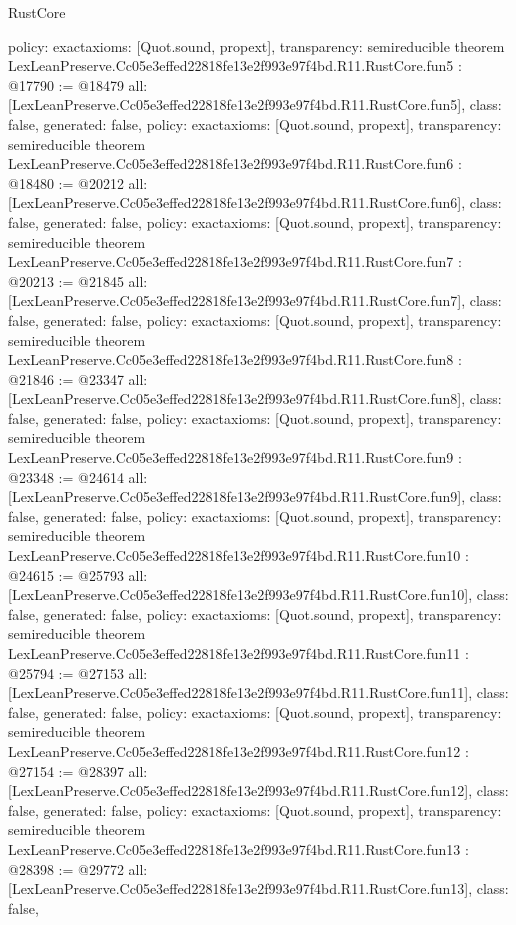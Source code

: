 \begin{lexlean}{RustCore}
\begin{coremodule}
{  policy: exact{axioms: [Quot.sound, propext]},
  transparency: semireducible
}
theorem LexLeanPreserve.Cc05e3effed22818fe13e2f993e97f4bd.R11.RustCore.fun5 : @17790 := @18479 {
  all: [LexLeanPreserve.Cc05e3effed22818fe13e2f993e97f4bd.R11.RustCore.fun5],
  class: false,
  generated: false,
  policy: exact{axioms: [Quot.sound, propext]},
  transparency: semireducible
}
theorem LexLeanPreserve.Cc05e3effed22818fe13e2f993e97f4bd.R11.RustCore.fun6 : @18480 := @20212 {
  all: [LexLeanPreserve.Cc05e3effed22818fe13e2f993e97f4bd.R11.RustCore.fun6],
  class: false,
  generated: false,
  policy: exact{axioms: [Quot.sound, propext]},
  transparency: semireducible
}
theorem LexLeanPreserve.Cc05e3effed22818fe13e2f993e97f4bd.R11.RustCore.fun7 : @20213 := @21845 {
  all: [LexLeanPreserve.Cc05e3effed22818fe13e2f993e97f4bd.R11.RustCore.fun7],
  class: false,
  generated: false,
  policy: exact{axioms: [Quot.sound, propext]},
  transparency: semireducible
}
theorem LexLeanPreserve.Cc05e3effed22818fe13e2f993e97f4bd.R11.RustCore.fun8 : @21846 := @23347 {
  all: [LexLeanPreserve.Cc05e3effed22818fe13e2f993e97f4bd.R11.RustCore.fun8],
  class: false,
  generated: false,
  policy: exact{axioms: [Quot.sound, propext]},
  transparency: semireducible
}
theorem LexLeanPreserve.Cc05e3effed22818fe13e2f993e97f4bd.R11.RustCore.fun9 : @23348 := @24614 {
  all: [LexLeanPreserve.Cc05e3effed22818fe13e2f993e97f4bd.R11.RustCore.fun9],
  class: false,
  generated: false,
  policy: exact{axioms: [Quot.sound, propext]},
  transparency: semireducible
}
theorem LexLeanPreserve.Cc05e3effed22818fe13e2f993e97f4bd.R11.RustCore.fun10 : @24615 := @25793 {
  all: [LexLeanPreserve.Cc05e3effed22818fe13e2f993e97f4bd.R11.RustCore.fun10],
  class: false,
  generated: false,
  policy: exact{axioms: [Quot.sound, propext]},
  transparency: semireducible
}
theorem LexLeanPreserve.Cc05e3effed22818fe13e2f993e97f4bd.R11.RustCore.fun11 : @25794 := @27153 {
  all: [LexLeanPreserve.Cc05e3effed22818fe13e2f993e97f4bd.R11.RustCore.fun11],
  class: false,
  generated: false,
  policy: exact{axioms: [Quot.sound, propext]},
  transparency: semireducible
}
theorem LexLeanPreserve.Cc05e3effed22818fe13e2f993e97f4bd.R11.RustCore.fun12 : @27154 := @28397 {
  all: [LexLeanPreserve.Cc05e3effed22818fe13e2f993e97f4bd.R11.RustCore.fun12],
  class: false,
  generated: false,
  policy: exact{axioms: [Quot.sound, propext]},
  transparency: semireducible
}
theorem LexLeanPreserve.Cc05e3effed22818fe13e2f993e97f4bd.R11.RustCore.fun13 : @28398 := @29772 {
  all: [LexLeanPreserve.Cc05e3effed22818fe13e2f993e97f4bd.R11.RustCore.fun13],
  class: false,
}
\end{coremodule}
\end{lexlean}
